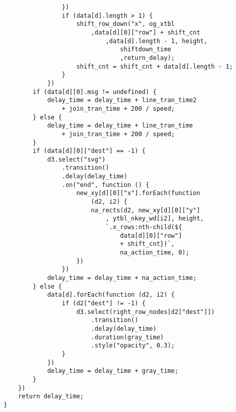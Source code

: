 \begin{lstlisting}
                })
                if (data[d].length > 1) {
                    shift_row_down("x", og_xtbl
                        ,data[d][0]["row"] + shift_cnt
                            ,data[d].length - 1, height, 
                                shiftdown_time
                                ,return_delay);
                    shift_cnt = shift_cnt + data[d].length - 1;
                }
            })
        if (data[d][0].msg != undefined) {
            delay_time = delay_time + line_tran_time2 
                + join_tran_time + 200 / speed;
        } else {
            delay_time = delay_time + line_tran_time 
                + join_tran_time + 200 / speed;
        }
        if (data[d][0]["dest"] == -1) {
            d3.select("svg")
                .transition()
                .delay(delay_time)
                .on("end", function () {
                    new_xy[d][0]["x"].forEach(function 
                        (d2, i2) {
                        na_rects(d2, new_xy[d][0]["y"]
                            , ytbl_nkey_wd[i2], height,
                            `.x_rows:nth-child(${
                                data[d][0]["row"] 
                                + shift_cnt})`, 
                                na_action_time, 0);
                    })
                })
            delay_time = delay_time + na_action_time;
        } else {
            data[d].forEach(function (d2, i2) {
                if (d2["dest"] != -1) {
                    d3.select(right_row_nodes[d2["dest"]])
                        .transition()
                        .delay(delay_time)
                        .duration(gray_time)
                        .style("opacity", 0.3);
                }
            })
            delay_time = delay_time + gray_time;
        }
    })
    return delay_time;
}


\end{lstlisting}
